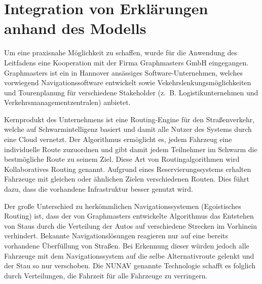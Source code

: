 \section{Integration von Erklärungen anhand des Modells}

Um eine praxisnahe Möglichkeit zu schaffen, wurde für die Anwendung des Leitfadens eine Kooperation mit der Firma Graphmasters GmbH eingegangen. Graphmasters ist ein in Hannover ansässiges Software-Unternehmen, welches vorwiegend Navigationssoftware entwickelt sowie Vekehrslenkungsmöglichkeiten und Tourenplanung für verschiedene Stakeholder (z.~B. Logistikunternehmen und Verkehrsmanagementzentralen) anbietet. 

Kernprodukt des Unternehmens ist eine Routing-Engine für den Straßenverkehr, welche auf Schwarmintelligenz basiert und damit alle Nutzer des Systems durch eine Cloud vernetzt. Der Algorithmus ermöglicht es, jedem Fahrzeug eine individuelle Route zuzuordnen und gibt damit jedem Teilnehmer im Schwarm die bestmögliche Route zu seinem Ziel. Diese Art von Routingalgorithmen wird \glqq Kollaboratives Routing\grqq{} genannt. Aufgrund eines Reservierungssystems erhalten Fahrzeuge mit gleichen oder ähnlichen Zielen verschiedenen Routen. Dies führt dazu, dass die vorhandene Infrastruktur besser genutzt wird.

Der große Unterschied zu herkömmlichen Navigationssystemen (\glqq Egoistisches Routing\grqq{}) ist, dass der von Graphmasters entwickelte Algorithmus das Entstehen von Staus durch die Verteilung der Autos auf verschiedene Strecken im Vorhinein verhindert. Bekannte Navigationslösungen reagieren nur auf eine bereits vorhandene Überfüllung von Straßen. Bei Erkennung dieser würden jedoch alle Fahrzeuge mit dem Navigationssystem auf die selbe Alternativroute gelenkt und der Stau so nur verschoben. Die NUNAV genannte Technologie schafft es folglich durch Verteilungen, die Fahrzeit für alle Fahrzeuge zu verringern.











